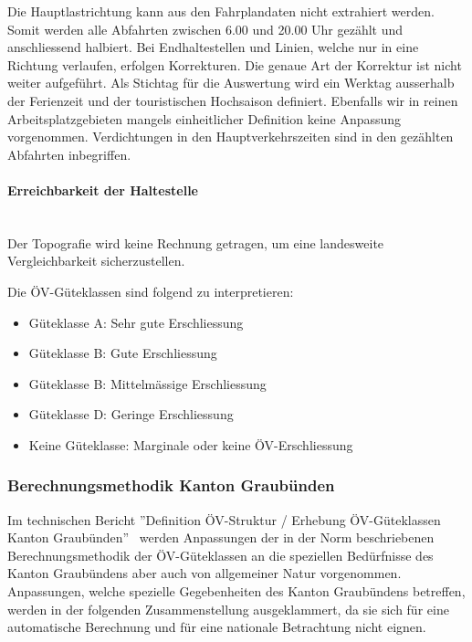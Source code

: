 Die Hauptlastrichtung kann aus den Fahrplandaten nicht extrahiert werden.
Somit werden alle Abfahrten zwischen 6.00 und 20.00 Uhr gezählt und anschliessend halbiert. Bei Endhaltestellen und Linien, welche nur in eine Richtung verlaufen, erfolgen Korrekturen.
Die genaue Art der Korrektur ist nicht weiter aufgeführt.
Als Stichtag für die Auswertung wird ein Werktag ausserhalb der Ferienzeit und der touristischen Hochsaison definiert.
Ebenfalls wir in reinen Arbeitsplatzgebieten mangels einheitlicher Definition keine Anpassung vorgenommen.
Verdichtungen in den Hauptverkehrszeiten sind in den gezählten Abfahrten inbegriffen.

\paragraph{Erreichbarkeit der Haltestelle}~\\
\label{Berechnungsmethodik ARE:Erreichbarkeit der Haltestelle}
Der Topografie wird keine Rechnung getragen, um eine landesweite Vergleichbarkeit sicherzustellen.

Die \acs{ÖV}-Güteklassen sind folgend zu interpretieren:

\begin{itemize}[noitemsep]
    \item Güteklasse A: Sehr gute Erschliessung
    \item Güteklasse B: Gute Erschliessung
    \item Güteklasse B: Mittelmässige Erschliessung
    \item Güteklasse D: Geringe Erschliessung
    \item Keine Güteklasse: Marginale oder keine \acs{ÖV}-Erschliessung
\end{itemize}

\subsubsection{Berechnungsmethodik Kanton Graubünden}
\label{Lösungsansätze:Berechnungsmethodik Kanton Graubünden}
Im technischen Bericht ''Definition \acs{ÖV}-Struktur / Erhebung  \acs{ÖV}-Güteklassen Kanton Graubünden''~\cite{oev-guteklasse-gr} werden Anpassungen der in der Norm beschriebenen Berechnungsmethodik der \acs{ÖV}-Güteklassen an die speziellen Bedürfnisse des Kanton Graubündens aber auch von allgemeiner Natur vorgenommen.
Anpassungen, welche spezielle Gegebenheiten des Kanton Graubündens betreffen, werden in der folgenden Zusammenstellung ausgeklammert, da sie sich für eine automatische Berechnung und für eine nationale Betrachtung nicht eignen.

